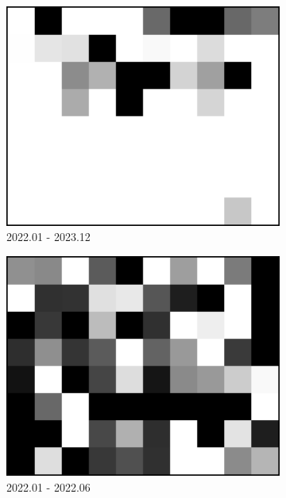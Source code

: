 \documentclass[preprint, authoryear]{elsarticle}
\begin{document}
\begin{figure}
\begin{subfigure}{0.3\textwidth}
        \centering
        \includegraphics[width=\textwidth]{figure/The azimuth shift/shift_Milan_des_20231222.png}
        \caption{2022.01 - 2023.12}
        \label{fig_7f}
    \end{subfigure}
        \begin{subfigure}{0.3\textwidth}
        \centering
        \includegraphics[width=\textwidth]{figure/The azimuth shift/shift_TaklimakanDesert_asc_20220624.png}
        \caption{2022.01 - 2022.06}
        \label{fig_7j}
    \end{subfigure}
    \begin{subfigure}{0.3\textwidth}

\end{subfigure}
\end{figure}
\end{document}
